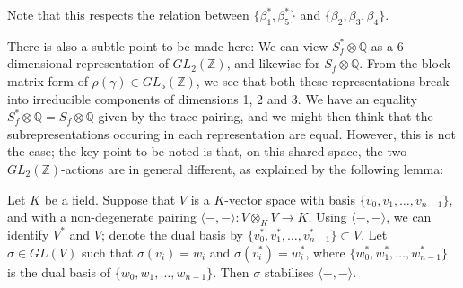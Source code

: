 \documentclass{article}
\begin{document}
Note that this respects the relation between $\{ \beta_1^*, \beta_5^* \}$ and $\{ \beta_2, \beta_3, \beta_4 \}$.

There is also a subtle point to be made here: We can view $S_f^* \otimes \mathbb{Q}$ as a 6-dimensional representation of $GL_2(\mathbb{Z})$, and likewise for $S_f \otimes \mathbb{Q}$.  From the block matrix form of $\rho (\gamma) \in GL_5(\mathbb{Z})$, we see that both these representations break into irreducible components of dimensions 1, 2 and 3.  We have an equality $S_f^* \otimes \mathbb{Q} = S_f \otimes \mathbb{Q}$ given by the trace pairing, and we might then think that the subrepresentations occuring in each representation are equal.  However, this is not the case; the key point to be noted is that, on this shared space, the two $GL_2(\mathbb{Z})$-actions are in general different, as explained by the following lemma:

\begin{lemma}
Let $K$ be a field.  Suppose that $V$ is a $K$-vector space with basis $\{v_0,v_1,\ldots,v_{n-1}\}$, and with a non-degenerate pairing $\langle -,- \rangle : V \otimes_K V \to K$.  Using $\langle -,- \rangle$, we can identify $V^*$ and $V$; denote the dual basis by $\{v_0^*,v_1^*,\ldots,v_{n-1}^*\} \subset V$.  Let $\sigma \in GL(V)$ such that $\sigma(v_i) = w_i$ and $\sigma(v_i^*) = w_i^*$, where $\{w_0^*,w_1^*,\ldots,w_{n-1}^*\}$ is the dual basis of $\{w_0,w_1,\ldots,w_{n-1}\}$.  Then $\sigma$ stabilises $\langle -,- \rangle$.
\end{lemma}
\end{document}
